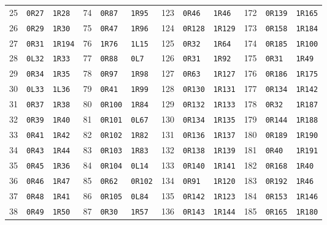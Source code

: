 \begin{center}
\begin{tabular}{@{}rll@{\hspace{12pt}}rll@{\hspace{12pt}}rll@{\hspace{12pt}}rll@{}}
25 & \texttt{0R27} & \texttt{1R28} & 74 & \texttt{0R87} & \texttt{1R95} & 123 & \texttt{0R46} & \texttt{1R46} & 172 & \texttt{0R139} & \texttt{1R165}\\
26 & \texttt{0R29} & \texttt{1R30} & 75 & \texttt{0R47} & \texttt{1R96} & 124 & \texttt{0R128} & \texttt{1R129} & 173 & \texttt{0R158} & \texttt{1R184}\\
27 & \texttt{0R31} & \texttt{1R194} & 76 & \texttt{1R76} & \texttt{1L15} & 125 & \texttt{0R32} & \texttt{1R64} & 174 & \texttt{0R185} & \texttt{1R100}\\
28 & \texttt{0L32} & \texttt{1R33} & 77 & \texttt{0R88} & \texttt{0L7} & 126 & \texttt{0R31} & \texttt{1R92} & 175 & \texttt{0R31} & \texttt{1R49}\\
29 & \texttt{0R34} & \texttt{1R35} & 78 & \texttt{0R97} & \texttt{1R98} & 127 & \texttt{0R63} & \texttt{1R127} & 176 & \texttt{0R186} & \texttt{1R175}\\
30 & \texttt{0L33} & \texttt{1L36} & 79 & \texttt{0R41} & \texttt{1R99} & 128 & \texttt{0R130} & \texttt{1R131} & 177 & \texttt{0R134} & \texttt{1R142}\\
31 & \texttt{0R37} & \texttt{1R38} & 80 & \texttt{0R100} & \texttt{1R84} & 129 & \texttt{0R132} & \texttt{1R133} & 178 & \texttt{0R32} & \texttt{1R187}\\
32 & \texttt{0R39} & \texttt{1R40} & 81 & \texttt{0R101} & \texttt{0L67} & 130 & \texttt{0R134} & \texttt{1R135} & 179 & \texttt{0R144} & \texttt{1R188}\\
33 & \texttt{0R41} & \texttt{1R42} & 82 & \texttt{0R102} & \texttt{1R82} & 131 & \texttt{0R136} & \texttt{1R137} & 180 & \texttt{0R189} & \texttt{1R190}\\
34 & \texttt{0R43} & \texttt{1R44} & 83 & \texttt{0R103} & \texttt{1R83} & 132 & \texttt{0R138} & \texttt{1R139} & 181 & \texttt{0R40} & \texttt{1R191}\\
35 & \texttt{0R45} & \texttt{1R36} & 84 & \texttt{0R104} & \texttt{0L14} & 133 & \texttt{0R140} & \texttt{1R141} & 182 & \texttt{0R168} & \texttt{1R40}\\
36 & \texttt{0R46} & \texttt{1R47} & 85 & \texttt{0R62} & \texttt{0R102} & 134 & \texttt{0R91} & \texttt{1R120} & 183 & \texttt{0R192} & \texttt{1R46}\\
37 & \texttt{0R48} & \texttt{1R41} & 86 & \texttt{0R105} & \texttt{0L84} & 135 & \texttt{0R142} & \texttt{1R123} & 184 & \texttt{0R153} & \texttt{1R146}\\
38 & \texttt{0R49} & \texttt{1R50} & 87 & \texttt{0R30} & \texttt{1R57} & 136 & \texttt{0R143} & \texttt{1R144} & 185 & \texttt{0R165} & \texttt{1R180}\\

\end{tabular}
\end{center}
